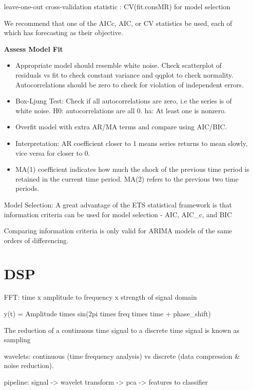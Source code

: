 \documentclass[]{book}
\begin{document}
leave-one-out cross-validation statistic : CV(fit.consMR) for model
selection

We recommend that one of the AICc, AIC, or CV statistics be used, each
of which has forecasting as their objective.

\textbf{Assess Model Fit}

\begin{itemize}
\item
  Appropriate model should resemble white noise. Check scatterplot of
  residuals vs fit to check constant variance and qqplot to check
  normality. Autocorrelations should be zero to check for violation of
  independent errors.
\item
  Box-Ljung Test: Check if all autocorrelations are zero, i.e the series
  is of white noise. H0: autocorrelations are all 0. ha: At least one is
  nonzero.
\item
  Overfit model with extra AR/MA terms and compare using AIC/BIC.
\item
  Interpretation: AR coefficient closer to 1 means series returns to
  mean slowly, vice versa for closer to 0.
\item
  MA(1) coefficient indicates how much the shock of the previous time
  period is retained in the current time period. MA(2) refers to the
  previous two time periods.
\end{itemize}

Model Selection: A great advantage of the ETS statistical framework is
that information criteria can be used for model selection - AIC, AIC\_c,
and BIC

Comparing information criteria is only valid for ARIMA models of the
same orders of differencing.

\section{DSP}\label{dsp}

FFT: time x amplitude to frequency x strength of signal domain

y(t) = Amplitude times sin(2pi times freq times time + phase\_shift)

The reduction of a continuous time signal to a discrete time signal is
known as sampling

wavelets: continuous (time frequency analysis) vs discrete (data
compression \& noise reduction).

pipeline: signal -\textgreater{} wavelet transform -\textgreater{} pca
-\textgreater{} features to classifier
\end{document}
